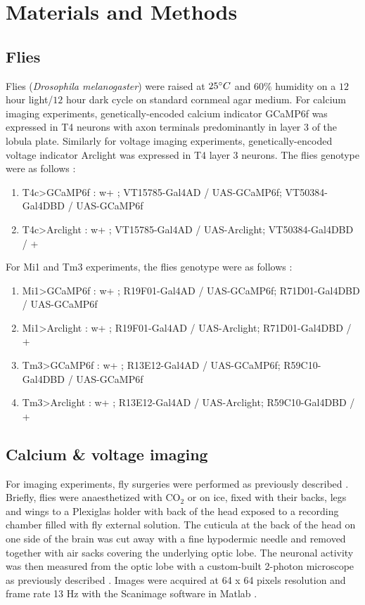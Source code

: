 \documentclass[9pt,lineno]{elife}
\begin{document}
\section{Materials and Methods}
\subsection{Flies}
Flies (\textit{Drosophila melanogaster}) were raised at $25\degree C$ and $60\%$ humidity on a $12$ hour light/$12$ hour dark cycle on standard cornmeal agar medium. For calcium imaging experiments, genetically-encoded calcium indicator GCaMP6f \parencite{Chen2013} was expressed in T4 neurons with axon terminals predominantly in  layer 3 of the lobula plate. Similarly for voltage imaging experiments, genetically-encoded voltage indicator Arclight \parencite{Jin2012} was expressed in T4 layer 3 neurons. The flies genotype were as follows : 
\begin{enumerate}
\item T4c>GCaMP6f :	w+ ; VT15785-Gal4AD / UAS-GCaMP6f; VT50384-Gal4DBD / UAS-GCaMP6f 
\item T4c>Arclight :	w+ ; VT15785-Gal4AD / UAS-Arclight; VT50384-Gal4DBD / + 
\end{enumerate}

For Mi1 and Tm3 experiments, the flies genotype were as follows :
\begin{enumerate}
\item Mi1>GCaMP6f :		w+ ; R19F01-Gal4AD / UAS-GCaMP6f; R71D01-Gal4DBD / UAS-GCaMP6f 
\item Mi1>Arclight :		w+ ; R19F01-Gal4AD / UAS-Arclight; R71D01-Gal4DBD / +
\item Tm3>GCaMP6f :		w+ ; R13E12-Gal4AD / UAS-GCaMP6f; R59C10-Gal4DBD / UAS-GCaMP6f 
\item Tm3>Arclight :		w+ ; R13E12-Gal4AD / UAS-Arclight; R59C10-Gal4DBD / +

\end{enumerate}

\subsection{Calcium \& voltage imaging}
For imaging experiments, fly surgeries were performed as previously described \parencite{Maisak2013}. Briefly, flies were anaesthetized with CO$_2$ or on ice, fixed with their backs, legs and wings to a Plexiglas holder with back of the head exposed to a recording chamber filled with fly external solution. The cuticula at the back of the head on one side of the brain was cut away with a fine hypodermic needle and removed together with air sacks covering the underlying optic lobe. The neuronal activity was then measured from the optic lobe with a custom-built 2-photon microscope as previously described \parencite{Maisak2013}. Images were acquired at 64 x 64 pixels resolution and frame rate 13 Hz with the Scanimage software in Matlab  \parencite{Pologruto2003}.
\end{document}
